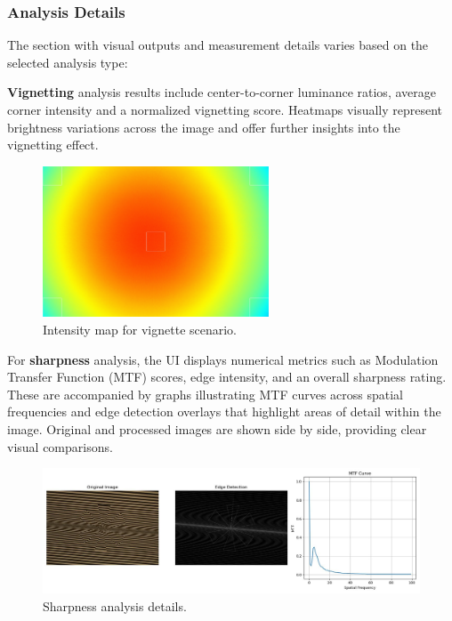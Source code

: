 \subsubsection{Analysis Details}

The section with visual outputs and measurement details varies based on the selected analysis type:

\textbf{Vignetting} analysis results include center-to-corner luminance ratios, average corner intensity and a normalized vignetting score. Heatmaps visually represent brightness variations across the image and offer further insights into the vignetting effect.

\begin{figure}[hbt]
\centering
\includegraphics[width=0.6\textwidth]{Images/vignette_image_result.jpg}
\caption{Intensity map for vignette scenario.}
\label{fig:ui_vignette_intensity_map}
\end{figure}

For \textbf{sharpness} analysis, the UI displays numerical metrics such as Modulation Transfer Function (MTF) scores, edge intensity, and an overall sharpness rating. These are accompanied by graphs illustrating MTF curves across spatial frequencies and edge detection overlays that highlight areas of detail within the image. Original and processed images are shown side by side, providing clear visual comparisons.

\begin{figure}[h]
\centering
\includegraphics[width=1\textwidth]{Images/sharpness_image_result.jpg}
\caption{Sharpness analysis details.}
\label{fig:ui_sharpness_image}
\end{figure}

